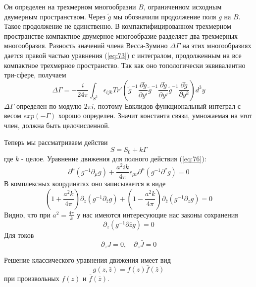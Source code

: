 \documentclass[a4paper,12pt]{article}
\theoremstyle{definition} \newtheorem{Def}{Definition}
\begin{document}
Он определен на трехмерном многообразии $B$, ограниченном исходным двумерным пространством. 
Через $\tilde{g}$ мы обозначили продолжение поля  $g$ на $B$. Такое продолжение не единственно. В компактифицированном трехмерном пространстве компактное двумерное многообразие разделяет два трехмерных многообразия. Разность значений члена Весса-Зумино  $\Delta\Gamma$ на этих многообразиях дается правой частью уравнения (\ref{eq:73}) с интегралом, продолженным на все компактное трехмерное пространство. Так как оно топологически эквивалентно три-сфере, получаем
\begin{equation}
  \label{eq:75}
\Delta\Gamma=  - \frac{i }{24\pi} \int_{S^3}\epsilon_{ijk} Tr'\left(
    \tilde g^{-1}\frac{\partial \tilde g}{\partial y^i}
      \tilde g^{-1}\frac{\partial \tilde g}{\partial y^j}
      \tilde g^{-1}\frac{\partial \tilde g}{\partial y^k}\right) d^3y
\end{equation}
$\Delta\Gamma$ определен по модулю $2\pi i$, поэтому Евклидов функциональный интеграл с весом  $exp(-\Gamma)$ хорошо определен. Значит константа связи, умножаемая на этот член, должна быть целочисленной.

Теперь мы рассматриваем действи
\begin{equation}
  \label{eq:76}
  S=S_0+k\Gamma
\end{equation}
где $k$ - целое.
Уравнение движения для полного действия (\ref{eq:76}):
\begin{equation}
  \label{eq:77}
  \partial^{\mu}(g^{-1}\partial_{\mu}g)+\frac{a^2 ik}{4\pi}\epsilon_{\mu\nu}\partial^{\mu}(g^{-1}\partial^{\nu}g)=0
\end{equation}
В комплексных координатах оно записывается в виде
\begin{equation}
  \label{eq:78}
  (1+\frac{a^2 k}{4\pi})\partial_z(g^{-1}\partial_{\bar z}g)+(1-\frac{a^2 k}{4\pi})\partial_{\bar z}(g^{-1}\partial_z g)=0
\end{equation}
Видно, что при $a^2=\frac{4\pi}{k}$ у нас имеются интересующие нас законы сохранения
\begin{equation}
  \label{eq:79}
  \partial_z(g^{-1}\partial{\bar z}g)=0
\end{equation}
Для токов
\begin{equation}
  \label{eq:4}
  \partial_{\bar z}J=0,\quad \partial_z \bar J=0
\end{equation}

Решение классического уравнения движения имеет вид
\begin{equation}
  \label{eq:80}
  g(z,\bar z)=f(z)\bar f(\bar z)
\end{equation}
при произвольных $f(z)$ и $\bar f (\bar z)$.
\end{document}
